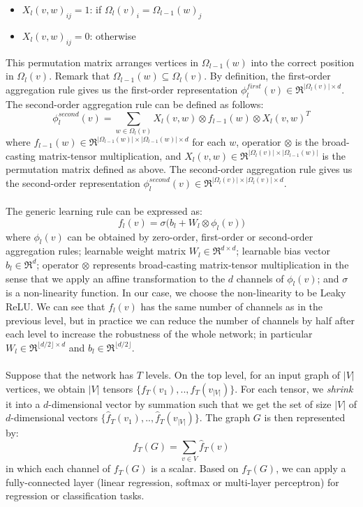 \documentclass[a4paper]{article}
\begin{document}
\begin{itemize}
	\item $X_l(v, w)_{ij} = 1$: if $\Omega_l(v)_i = \Omega_{l - 1}(w)_j$
	\item $X_l(v, w)_{ij} = 0$: otherwise
\end{itemize}
This permutation matrix arranges vertices in $\Omega_{l - 1}(w)$ into the correct position in $\Omega_l(v)$. Remark that $\Omega_{l - 1}(w) \subseteq \Omega_l(v)$. By definition, the first-order aggregation rule gives us the first-order representation $\phi_l^{first}(v) \in \Re^{|\Omega_l(v)| \times d}$. The second-order aggregation rule can be defined as follows:
$$\phi_l^{second}(v) = \sum\limits_{w \in \Omega_l(v)} X_l(v, w) \otimes f_{l - 1}(w) \otimes X_l(v, w)^T$$
where $f_{l - 1}(w) \in \Re^{|\Omega_{l - 1}(w)| \times |\Omega_{l - 1}(w)| \times d}$ for each $w$, operatior $\otimes$ is the broad-casting matrix-tensor multiplication, and $X_l(v, w) \in \Re^{|\Omega_l(v)| \times |\Omega_{l - 1}(w)|}$ is the permutation matrix defined as above. The second-order aggregation rule gives us the second-order representation $\phi_l^{second}(v) \in \Re^{|\Omega_l(v)| \times |\Omega_l(v)| \times d}$. \\ \\
The generic learning rule can be expressed as:
$$f_l(v) = \sigma \big( b_l + W_l \otimes \phi_l(v) \big)$$
where $\phi_l(v)$ can be obtained by zero-order, first-order or second-order aggregation rules; learnable weight matrix $W_l \in \Re^{d \times d}$; learnable bias vector $b_l \in \Re^d$; operator $\otimes$ represents broad-casting matrix-tensor multiplication in the sense that we apply an affine transformation to the $d$ channels of $\phi_l(v)$; and $\sigma$ is a non-linearity function. In our case, we choose the non-linearity to be Leaky ReLU. We can see that $f_l(v)$ has the same number of channels as in the previous level, but in practice we can reduce the number of channels by half after each level to increase the robustness of the whole network; in particular $W_l \in \Re^{\lfloor d/2 \rfloor \times d}$ and $b_l \in \Re^{\lfloor d / 2 \rfloor}$. \\ \\
Suppose that the network has $T$ levels. On the top level, for an input graph of $|V|$ vertices, we obtain $|V|$ tensors $\{f_T(v_1), .., f_T(v_{|V|})\}$. For each tensor, we \textit{shrink} it into a $d$-dimensional vector by summation such that we get the set of size $|V|$ of $d$-dimensional vectors $\{\hat{f}_T(v_1), .., \hat{f}_T(v_{|V|})\}$. The graph $G$ is then represented by:
$$f_T(G) = \sum\limits_{v \in V} \hat{f}_T(v)$$
in which each channel of $f_T(G)$ is a scalar. Based on $f_T(G)$, we can apply a fully-connected layer (linear regression, softmax or multi-layer perceptron) for regression or classification tasks. 
\end{document}
